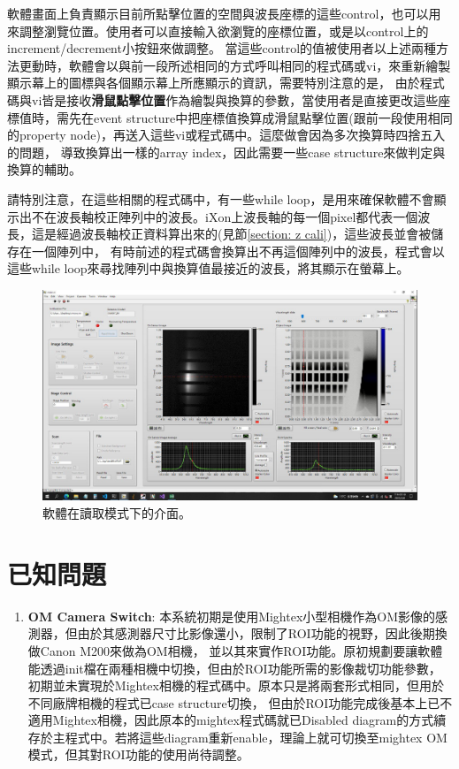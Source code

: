\documentclass[12pt]{article}
\begin{document}
    軟體畫面上負責顯示目前所點擊位置的空間與波長座標的這些control，也可以用來調整瀏覽位置。使用者可以直接輸入欲瀏覽的座標位置，或是以control上的increment/decrement小按鈕來做調整。
    當這些control的值被使用者以上述兩種方法更動時，軟體會以與前一段所述相同的方式呼叫相同的程式碼或vi，來重新繪製顯示幕上的圖標與各個顯示幕上所應顯示的資訊，需要特別注意的是，
    由於程式碼與vi皆是接收\textbf{滑鼠點擊位置}作為繪製與換算的參數，當使用者是直接更改這些座標值時，需先在event structure中把座標值換算成滑鼠點擊位置(跟前一段使用相同的property node)，再送入這些vi或程式碼中。這麼做會因為多次換算時四捨五入的問題，
    導致換算出一樣的array index，因此需要一些case structure來做判定與換算的輔助。

    請特別注意，在這些相關的程式碼中，有一些while loop，是用來確保軟體不會顯示出不在波長軸校正陣列中的波長。iXon上波長軸的每一個pixel都代表一個波長，這是經過波長軸校正資料算出來的(見節\ref{section: z cali})，這些波長並會被儲存在一個陣列中，
    有時前述的程式碼會換算出不再這個陣列中的波長，程式會以這些while loop來尋找陣列中與換算值最接近的波長，將其顯示在螢幕上。

    \begin{figure}
        \centering
        \includegraphics[width=\linewidth]{readmode.jpeg}
        \caption{軟體在讀取模式下的介面。}
        \label{figure: om_evenest_on}
    \end{figure}
    \section{已知問題}
    \begin{enumerate}
        \item \textbf{OM Camera Switch}: 本系統初期是使用Mightex小型相機作為OM影像的感測器，但由於其感測器尺寸比影像還小，限制了ROI功能的視野，因此後期換做Canon M200來做為OM相機，
        並以其來實作ROI功能。原初規劃要讓軟體能透過init檔在兩種相機中切換，但由於ROI功能所需的影像裁切功能參數，初期並未實現於Mightex相機的程式碼中。原本只是將兩套形式相同，但用於不同廠牌相機的程式已case structure切換，
        但由於ROI功能完成後基本上已不適用Mightex相機，因此原本的mightex程式碼就已Disabled diagram的方式續存於主程式中。若將這些diagram重新enable，理論上就可切換至mightex OM模式，但其對ROI功能的使用尚待調整。
    \end{enumerate}
\end{document}
